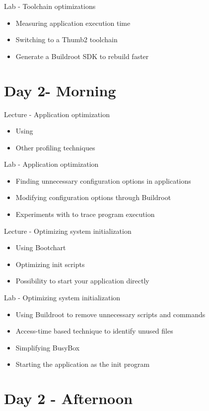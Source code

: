 \documentclass[a4paper,12pt,obeyspaces,spaces,hyphens]{article}
\begin{document}
\feagendaonecolumn
{Lab - Toolchain optimizations}
{
  \begin{itemize}
  \item Measuring application execution time
  \item Switching to a Thumb2 toolchain
  \item Generate a Buildroot SDK to rebuild faster
  \end{itemize}
}

\section{Day 2- Morning}

\feagendatwocolumn
{Lecture - Application optimization}
{
  \begin{itemize}
  \item Using 
  \item Other profiling techniques
  \end{itemize}
}
{Lab - Application optimization}
{
 \begin{itemize}
 \item Finding unnecessary configuration options in applications
 \item Modifying configuration options through Buildroot
 \item Experiments with  to trace program execution
 \end{itemize}
}

\feagendatwocolumn
{Lecture - Optimizing system initialization}
{
  \begin{itemize}
  \item Using Bootchart
  \item Optimizing init scripts
  \item Possibility to start your application directly
  \end{itemize}
}
{Lab - Optimizing system initialization}
{
 \begin{itemize}
 \item Using Buildroot to remove unnecessary scripts and commands
 \item Access-time based technique to identify  unused files
 \item Simplifying BusyBox
 \item Starting the application as the init program
 \end{itemize}
}

\section{Day 2 - Afternoon}
\end{document}
